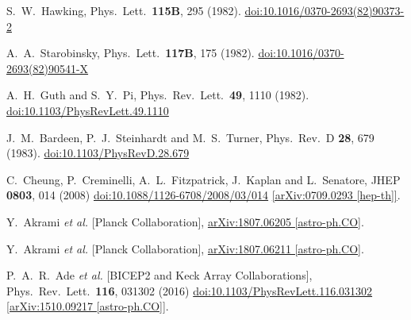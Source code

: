 \documentclass[12pt]{article}
\begin{document}
\begin{thebibliography}{99}
  S.~W.~Hawking,
  Phys.\ Lett.\  {\bf 115B}, 295 (1982).
  \href{https://dx.doi.org/10.1016/0370-2693(82)90373-2}{doi:10.1016/0370-2693(82)90373-2}

  A.~A.~Starobinsky,
  Phys.\ Lett.\  {\bf 117B}, 175 (1982).
  \href{https://dx.doi.org/10.1016/0370-2693(82)90541-X}{doi:10.1016/0370-2693(82)90541-X}

  A.~H.~Guth and S.~Y.~Pi,
  Phys.\ Rev.\ Lett.\  {\bf 49}, 1110 (1982).
  \href{https://dx.doi.org/10.1103/PhysRevLett.49.1110}{doi:10.1103/PhysRevLett.49.1110}

  J.~M.~Bardeen, P.~J.~Steinhardt and M.~S.~Turner,
  Phys.\ Rev.\ D {\bf 28}, 679 (1983).
  \href{https://dx.doi.org/10.1103/PhysRevD.28.679}{doi:10.1103/PhysRevD.28.679}

  C.~Cheung, P.~Creminelli, A.~L.~Fitzpatrick, J.~Kaplan and L.~Senatore,
  JHEP {\bf 0803}, 014 (2008)
  \href{https://dx.doi.org/10.1088/1126-6708/2008/03/014}{doi:10.1088/1126-6708/2008/03/014}
  \href{https://arxiv.org/abs/0709.0293}{[arXiv:0709.0293 [hep-th]]}.

  Y.~Akrami {\it et al.} [Planck Collaboration],
  \href{https://arxiv.org/abs/1807.06205}{arXiv:1807.06205 [astro-ph.CO]}.

  Y.~Akrami {\it et al.} [Planck Collaboration],
  \href{https://arxiv.org/abs/1807.06211}{arXiv:1807.06211 [astro-ph.CO]}.

  P.~A.~R.~Ade {\it et al.} [BICEP2 and Keck Array Collaborations],
  Phys.\ Rev.\ Lett.\  {\bf 116}, 031302 (2016)
  \href{https://dx.doi.org/10.1103/PhysRevLett.116.031302}{doi:10.1103/PhysRevLett.116.031302}
  \href{https://arxiv.org/abs/1510.09217}{[arXiv:1510.09217 [astro-ph.CO]]}.


\end{thebibliography}
\end{document}

